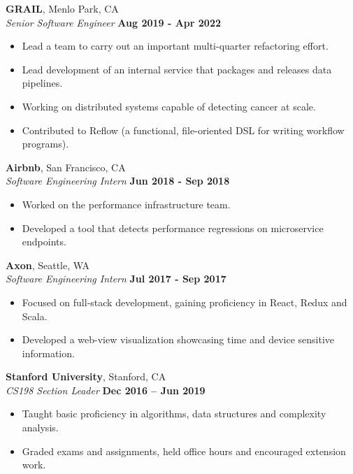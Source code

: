 \documentclass[margin,line]{resume}
\begin{document}
\begin{resume}
    \textbf{GRAIL}, Menlo Park, CA \vspace{1mm} \\\vspace{1mm}%
    \textsl{Senior Software Engineer} \hfill \textbf{Aug 2019 - Apr 2022}
    \begin{itemize}
        \item Lead a team to carry out an important multi-quarter refactoring effort.
	    \item Lead development of an internal service that packages and releases data pipelines.
        \item Working on distributed systems capable of detecting cancer at scale.
	    \item Contributed to Reflow (a functional, file-oriented DSL for writing workflow programs).
    \end{itemize}

    \textbf{Airbnb}, San Francisco, CA \vspace{1mm}\\\vspace{1mm}%
    \textsl{Software Engineering Intern} \hfill \textbf{Jun 2018 - Sep 2018}
    \begin{itemize}
        \item Worked on the performance infrastructure team.
        \item Developed a tool that detects performance regressions on microservice endpoints.
    \end{itemize}

    \textbf{Axon}, Seattle, WA \vspace{1mm}\\\vspace{1mm}%
    \textsl{Software Engineering Intern} \hfill \textbf{Jul 2017 - Sep 2017}
    \begin{itemize}
        \item Focused on full-stack development, gaining proficiency in React, Redux and Scala.
	    \item Developed a web-view visualization showcasing time and device sensitive information.
    \end{itemize}

    \textbf{Stanford University}, Stanford, CA \vspace{1mm}\\\vspace{1mm}%
    \textsl{CS198 Section Leader} \hfill \textbf{Dec 2016 -- Jun 2019}
    \begin{itemize}
        \item Taught basic proficiency in algorithms, data structures and complexity analysis.
	    \item Graded exams and assignments, held office hours and encouraged extension work.
    \end{itemize}


\end{resume}
\end{document}
